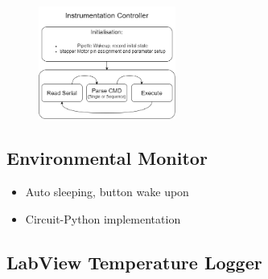 \begin{figure}[h]
    \centering
    \includegraphics[width=0.4\textwidth]{img/software.png}
\end{figure}

\subsection{Environmental Monitor}

\begin{itemize}
    \item Auto sleeping, button wake upon
    \item Circuit-Python implementation
\end{itemize}

\subsection{LabView Temperature Logger}

